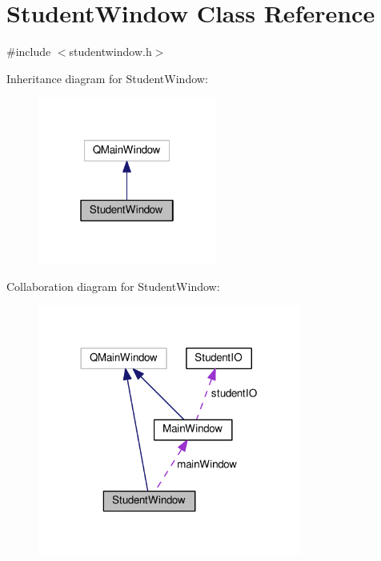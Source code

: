 \hypertarget{class_student_window}{}\section{Student\+Window Class Reference}
\label{class_student_window}


{\ttfamily \#include $<$studentwindow.\+h$>$}



Inheritance diagram for Student\+Window\+:
\nopagebreak
\begin{figure}[H]
\begin{center}
\leavevmode
\includegraphics[width=166pt]{class_student_window__inherit__graph}
\end{center}
\end{figure}


Collaboration diagram for Student\+Window\+:
\nopagebreak
\begin{figure}[H]
\begin{center}
\leavevmode
\includegraphics[width=245pt]{class_student_window__coll__graph}
\end{center}
\end{figure}
